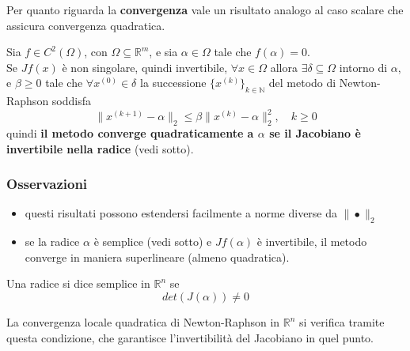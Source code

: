 \documentclass[12pt,a4paper,]{report}
\begin{document}
Per quanto riguarda la \textbf{convergenza} vale un risultato analogo al caso scalare che assicura convergenza quadratica.

\begin{teorema}
    Sia $f \in C^2(\Omega)$, con $\Omega \subseteq \mathbb{R}^m$, e sia $\alpha \in \Omega$ tale che $f(\alpha) = 0$.\\
    Se $Jf(x)$ è non singolare, quindi invertibile, $\forall x \in \Omega$ allora $\exists \delta \subseteq \Omega$ intorno di $\alpha$, e $\beta \geq 0$ tale che $\forall x^{(0)} \in \delta$ la successione $\{x^{(k)}\}_{k \in \mathbb{N}}$ del metodo di Newton-Raphson soddisfa
    \[
    \|x^{(k+1)} - \alpha\|_2 \leq \beta \|x^{(k)} - \alpha\|_2^2, \quad k \geq 0
    \]
   quindi \textbf{il metodo converge quadraticamente a $\alpha$ se il Jacobiano è invertibile nella radice} (vedi sotto).
\end{teorema}
\subsubsection{Osservazioni}
\begin{itemize}
    \item questi risultati possono estendersi facilmente a norme diverse da $\|\bullet\|_2$
    \item se la radice $\alpha$ è semplice (vedi sotto) e $Jf(\alpha)$ è invertibile, il metodo converge in maniera superlineare (almeno quadratica).
\end{itemize}
\begin{definizione}
    Una radice si dice semplice in $\mathbb{R}^n$ se
    \[
    det(J(\alpha)) \neq 0
    \]
\end{definizione}
La convergenza locale quadratica di Newton-Raphson in $\mathbb{R}^n$ si verifica tramite questa condizione, che garantisce l'invertibilità del Jacobiano in quel punto.

\begin{lezione}
    [Lezione 22 17/05]
\end{lezione}
\end{document}

